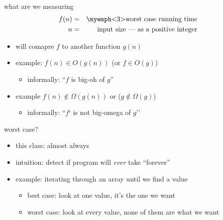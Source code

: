 \begin{frame}{what are we measuring}
\begin{eqnarray*}
    f(n) &=& \text{\myemph<3>{worst case} running time} \\
    n    &=& \text{input size --- as a positive integer} \\
\end{eqnarray*}
    \begin{itemize}
        \item<2-> will comapre $f$ to another function $g(n)$
        \item<2-> example: $f(n) \in O(g(n))$ (or $f \in O(g)$)
            \begin{itemize}
                \item informally: ``$f$ is big-oh of $g$''
            \end{itemize}
        \item<2-> example $f(n) \not\in \Omega(g(n))$ or ($g \not\in \Omega(g)$)
            \begin{itemize}
            \item informally: ``$f$` is not big-omega of $g$''
            \end{itemize}
    \end{itemize}
\end{frame}

\begin{frame}{worst case?}
    \begin{itemize}
    \item this class: almost always 
    \item intuition: detect if program will \textit{ever} take ``forever''
    \vspace{.5cm}
    \item<2-> example: iterating through an array until we find a value
        \begin{itemize}
        \item best case: look at one value, it's the one we want
        \item worst case: look at every value, none of them are what we want
        \end{itemize}
    \end{itemize}
\end{frame}
